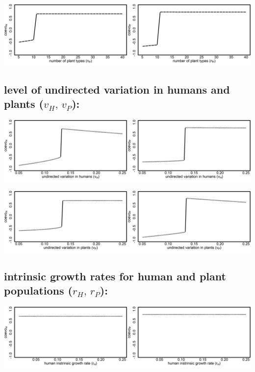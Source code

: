 \documentclass[]{book}
\begin{document}
\includegraphics[width=1\linewidth]{plots/2_onePar-n.P_bifplot-pair}

\hypertarget{level-of-undirected-variation-in-humans-and-plants-v_hv_p}{%
\subsection{\texorpdfstring{level of undirected variation in humans and plants (\(v_{H},\,v_{P}\)):}{level of undirected variation in humans and plants (v\_\{H\},\textbackslash{},v\_\{P\}):}}\label{level-of-undirected-variation-in-humans-and-plants-v_hv_p}}

\includegraphics[width=1\linewidth]{plots/2_onePar-v.H_bifplot-pair}

\includegraphics[width=1\linewidth]{plots/2_onePar-v.P_bifplot-pair}

\hypertarget{intrinsic-growth-rates-for-human-and-plant-populations-r_hr_p}{%
\subsection{\texorpdfstring{intrinsic growth rates for human and plant populations (\(r_{H},\,r_{P}\)):}{intrinsic growth rates for human and plant populations (r\_\{H\},\textbackslash{},r\_\{P\}):}}\label{intrinsic-growth-rates-for-human-and-plant-populations-r_hr_p}}

\includegraphics[width=1\linewidth]{plots/2_onePar-r.H_bifplot-pair}
\end{document}
